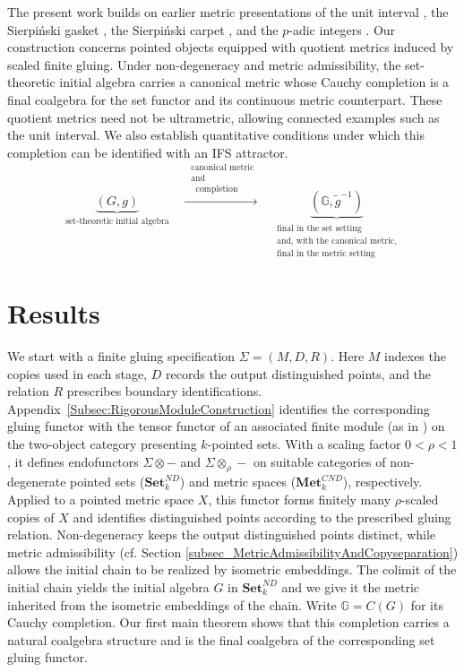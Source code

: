 \documentclass{sn-jnl}%
\theoremstyle{thmstyleone}%
\theoremstyle{thmstyletwo}%
\theoremstyle{thmstylethree}%
\newcommand{\setnd}{\mathbf{Set}_{k}^{ND}}
\newcommand{\mcnd}{\mathbf{Met}_{k}^{CND}}
\newcommand{\M}{\Sigma}
\newcommand{\F}{\M\otimes}
\newcommand{\Fw}{\M\otimes_{\w}}
\newcommand{\G}{\mathbb{G}}
\newcommand{\g}{\tilde{g}^{-1}}
\newcommand{\w}{\rho}
\begin{document}
The present work builds on earlier metric presentations of the unit interval \cite{Bhat,BhatTACL}, the Sierpiński gasket \cite{Sierpinski_gasket}, the Sierpiński carpet \cite{Sierpinsky_carpet}, and the $p$-adic integers \cite{Mano}. Our construction concerns pointed objects equipped with quotient metrics induced by scaled finite gluing. Under non-degeneracy and metric admissibility, the set-theoretic initial algebra carries a canonical metric whose Cauchy completion is a final coalgebra for the  set functor and its continuous metric counterpart. These quotient metrics need not be ultrametric, allowing connected examples such as the unit interval. We also establish quantitative conditions under which this completion can be identified with an IFS attractor.
\begin{equation} \nonumber
    \underbrace{(G,g)}_{\text{set-theoretic initial algebra}}
    \quad\xrightarrow{\;\substack{\text{canonical metric}\\ \text{and} \;\\{\;\;\text{completion}\;}}}\quad
    \underbrace{(\G,\g)}_{
        \substack{
            \text{final in the set setting}\\
            \text{and, with the canonical metric,}\\
            \text{final in the metric setting}
        }
    }
\end{equation}

\section{Results}
We start with a finite gluing specification $\Sigma=(M,D,R)$.  Here $M$ indexes the copies used in each stage, $D$ records the output distinguished points, and the relation $R$ prescribes boundary identifications. Appendix~\ref{Subsec:RigorousModuleConstruction} identifies the corresponding gluing functor with the tensor functor of an associated finite module (as in \cite{Lein}) on the two-object category presenting $k$-pointed sets. With a scaling factor $ 0< \rho <1$,  it defines endofunctors $\F-$ and $\Fw-$ on suitable categories of non-degenerate pointed sets ($\setnd$) and metric spaces ($\mcnd$), respectively. Applied to a pointed metric space $X$, this functor forms finitely many $\rho$-scaled copies of $X$ and identifies distinguished points according to the prescribed gluing relation.  Non-degeneracy keeps the output distinguished points distinct, while metric admissibility (cf. Section \ref{subsec_MetricAdmissibilityAndCopyseparation}) allows the initial chain to be realized by isometric embeddings. The colimit of the initial chain yields the initial algebra $G$ in $\setnd$ and we give it the metric inherited from the isometric embeddings of the chain. Write $\G=C(G)$ for its Cauchy completion. Our first main theorem shows that this completion carries a natural coalgebra structure and is the final coalgebra of the corresponding set gluing functor. 
\end{document}
